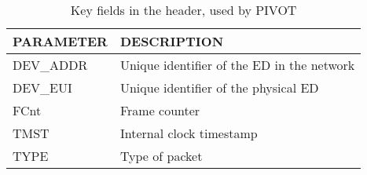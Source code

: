 \begin{table}[H]
    \vspace{4ex}%
    \caption{Key fields in the header, used by PIVOT}
    \label{tab:keys}
    \centering
    \begin{tabular}{|l|l|}
    \hline
        \textbf{PARAMETER} & \textbf{DESCRIPTION}                       \\ \hline
        DEV\_ADDR          & Unique identifier of the ED in the network \\ \hline
        DEV\_EUI           & Unique identifier of the physical ED       \\ \hline
	    FCnt		       & Frame counter                              \\ \hline
        TMST               & Internal clock timestamp                   \\ \hline
        TYPE               & Type of packet                             \\ \hline
    \end{tabular}
    \vspace{4ex}%
\end{table}